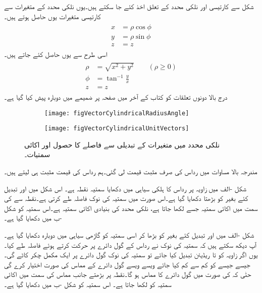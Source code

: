شکل  سے کارتیسی اور نلکی محدد کے تعلق اخذ کئے جا سکتے ہیں۔یوں نلکی محدد کے متغیرات  سے کارتیسی متغیرات  یوں حاصل ہوتے ہیں۔
\begin{gather}
\begin{aligned}
x&=\rho \cos \phi\\
y&=\rho \sin \phi\\
z&=z
\end{aligned}
\end{gather}
اسی طرح  سے   یوں حاصل کئے جاتے ہیں۔
\begin{gather}
\begin{aligned}
\rho&=\sqrt{x^2+y^2} \quad \quad (\rho \ge 0)\\
\phi&=\tan^{-1} \frac{y}{x}\\
z&=z
\end{aligned}
\end{gather}
%
درج بالا دونوں تعلقات کو کتاب کے آخر میں صفحہ  پر ضمیمے میں دوبارہ پیش کیا گیا ہے۔
\begin{figure}
\centering
\begin{subfigure}{0.5\textwidth}
\centering
\texttt{[image: figVectorCylindricalRadiusAngle]}
\end{subfigure}%
%
\begin{subfigure}{0.5\textwidth}
\centering
\texttt{[image: figVectorCylindricalUnitVectors]}
\end{subfigure}%
\caption{نلکی محدد میں متغیرات کے تبدیلی سے فاصلے کا حصول اور اکائی سمتیات۔}
\label{شکل_سمتیہ_نلکی_تبدیلی_متغیرات}
\end{figure}
مندرجہ بالا مساوات میں رداس کی صرف مثبت قیمت لی گئی۔ہم  رداس کی قیمت مثبت ہی لیتے ہیں۔

شکل -الف میں  زاویہ پر  رداس کا ہلکی سیاہی میں دکھایا سمتیہ نقطہ  ہے۔
اس شکل میں  اور  تبدیل کئے بغیر  کو  بڑھتا دکھایا گیا ہے۔اس صورت میں سمتیہ کی نوک  فاصلہ طے کرتی ہے۔نقطہ  سے  کی سمت میں اکائی سمتیہ جسے  لکھا جاتا ہے، نلکی محدد کی  بنیادی اکائی سمتیہ ہے۔اس سمتیہ کو شکل -ب میں دکھایا گیا ہے۔

شکل -الف میں    اور  تبدیل کئے بغیر  کو  بڑھا کر اسی سمتیہ کو گاڑھی سیاہی میں دوبارہ دکھایا گیا ہے۔آپ دیکھ سکتے ہیں کہ  سمتیہ کی نوک نے  رداس کے گول دائرے پر حرکت کرتے ہوئے   فاصلہ طے کیا۔یوں اگر زاویہ کو  تا  ریڈیئن تبدیل کیا جائے  تو سمتیہ کی نوک گول دائرے پر ایک مکمل چکر کاٹے گی۔جیسے جیسے  کو کم سے کم کیا جائے ویسے ویسے    گول دائرے کے مماس کی صورت اختیار کرے گی حتٰی کہ  کی صورت میں  گول دائرے کا مماس ہو گا۔نقطہ  پر بڑھتے  جانب مماس کی سمت میں اکائی سمتیہ کو  لکھا جاتا ہے۔ اس سمتیہ کو شکل -ب میں دکھایا گیا ہے۔

